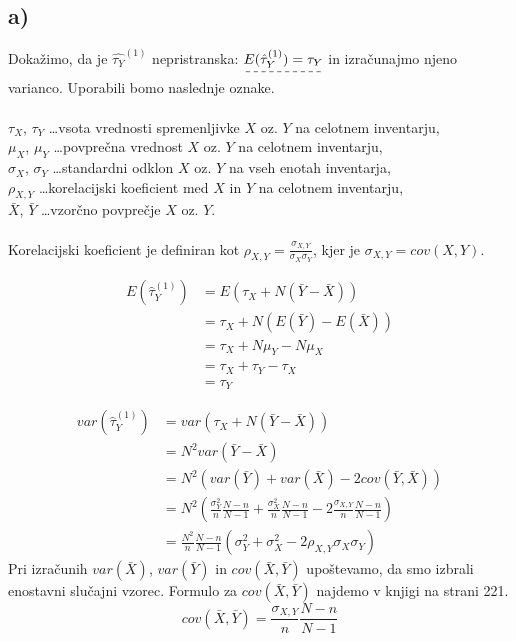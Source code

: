 \documentclass[A4paper, 11pt]{article}
\begin{document}
\subsection*{a)}
Dokažimo, da je $\hat{\tau_Y} ^ {(1)}$ nepristranska: $\dashuline{ E(\hat{\tau}_Y ^ {(1)}) = \tau_Y}$ in izračunajmo njeno varianco. Uporabili bomo naslednje oznake. \\
\\
$\tau_X$, $\tau_Y$ \ldots vsota vrednosti spremenljivke $X$ oz. $Y$ na celotnem inventarju, \\
$\mu_X$, $\mu_Y$ \ldots povprečna vrednost $X$ oz. $Y$ na celotnem inventarju, \\
$\sigma_X$, $\sigma_Y$ \ldots standardni odklon $X$ oz. $Y$ na vseh enotah inventarja, \\
$\rho_{X,Y}$ \ldots korelacijski koeficient med $X$ in $Y$ na celotnem inventarju, \\
$\bar{X}$, $\bar{Y}$ \ldots vzorčno povprečje $X$ oz. $Y$. \\
\\
Korelacijski koeficient je definiran kot $\rho_{X,Y} = \frac{\sigma_{X,Y}}{\sigma_X \sigma_Y}$, kjer je $\sigma_{X,Y} = cov(X,Y)$.


\[ 
\begin{split}
E(\hat{\tau}_Y ^ {(1)}) & = E(\tau_X + N (\bar{Y} - \bar{X})) \\
			       & = \tau_X  + N (E(\bar{Y}) - E(\bar{X})) \\
			       & = \tau_X + N \mu_Y - N \mu_X \\
			       & = \tau_X + \tau_Y - \tau_X \\
			       & = \tau_Y
\end{split}
\]

\[
\begin{split}
var(\hat{\tau}_Y ^ {(1)})  & = var(\tau_X + N (\bar{Y} - \bar{X})) \\
				& = N^2 var( \bar{Y} - \bar{X} ) \\
				& = N^2 \left ( var(\bar{Y}) + var(\bar{X}) - 2 cov(\bar{Y},\bar{X}) \right ) \\
				& = N^2 \left ( \frac{\sigma_Y^2}{n} \frac{N - n}{N - 1} + \frac{\sigma_X^2}{n} \frac{N - n}{N - 1} -  2  \frac{\sigma_{X,Y}}{n} \frac{N - n}{N - 1} \right ) \\
				&= \frac{N^2}{n} \frac{N - n}{N - 1} (\sigma_Y^2 + \sigma_X^2 - 2 \rho_{X,Y} \sigma_X \sigma_Y)
\end{split}
\]
Pri izračunih $var(\bar{X})$, $var(\bar{Y})$ in $cov(\bar{X},\bar{Y})$ upoštevamo, da smo izbrali enostavni slučajni vzorec. Formulo za $cov(\bar{X},\bar{Y})$ najdemo v knjigi na strani 221.
\[
cov(\bar{X},\bar{Y}) = \frac{\sigma_{X,Y}}{n} \frac{N - n}{N - 1}
\]
\end{document}
